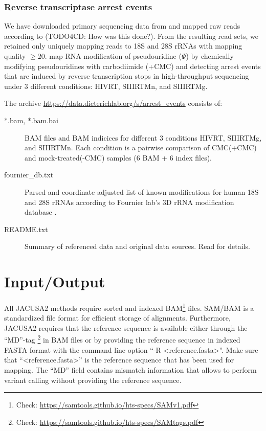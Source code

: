 \documentclass[10pt,a4paper,final]{article}
\begin{document}
\subsubsection{Reverse transcriptase arrest events}\label{sec:zhou2018_data}
We have downloaded primary sequencing data from \cite{Zhou2018} and mapped raw reads according to
(TODO4CD: How was this done?).
From the resulting read sets, we retained only uniquely mapping reads to 18S and 28S rRNAs with 
mapping quality $\ge 20$.
\cite{Zhou2018} map RNA modification of pseudouridine ($\Psi$) by chemically modifying
pseudouridines with carbodiimide (+CMC) and detecting arrest events that are induced by reverse
transcription stops in high-throughput sequencing under 3 different conditions: HIVRT, SIIIRTMn, and
SIIIRTMg.

The archive \url{https://data.dieterichlab.org/s/arrest_events} consists of:
\begin{description}
  \item[*.bam, *.bam.bai] BAM files and BAM indicices for different 3 conditions HIVRT, SIIIRTMg,
  and SIIIRTMn. Each condition is a pairwise comparison of CMC(+CMC) and mock-treated(-CMC) samples 
  (6 BAM + 6 index files).
  \item[fournier\_db.txt] Parsed and coordinate adjusted list of known modifications for human 18S
  and 28S rRNAs according to Fournier lab's 3D rRNA modification database \cite{PieknaPrzybylska2007}.
  \item[README.txt] Summary of referenced data and original data sources. Read for details.
\end{description}
\section{Input/Output}
All JACUSA2 methods require sorted and indexed BAM\footnote{Check: 
\url{https://samtools.github.io/hts-specs/SAMv1.pdf}} files.
SAM/BAM is a standardized file format for efficient storage of alignments.
Furthermore, JACUSA2 requires that the reference sequence is available either through the ``MD''-tag
\footnote{Check: \url{https://samtools.github.io/hts-specs/SAMtags.pdf}} in BAM files or by providing 
the reference sequence in indexed FASTA format with the command line option ``-R <reference.fasta>''.
Make sure that ``<reference.fasta>'' is the reference sequence that has been used for mapping. 
The ``MD'' field contains mismatch information that allows to perform variant calling without 
providing the reference sequence.
\end{document}

